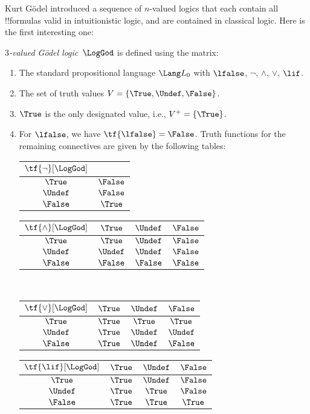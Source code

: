 \documentclass[../../../include/open-logic-section]{subfiles}
\begin{document}

Kurt G\"odel introduced a sequence of $n$-valued logics that each
contain all !!{formula}s valid in intuitionistic logic, and are
contained in classical logic.  Here is the first interesting one:

\begin{defn}
\emph{$3$-valued G\"odel logic}~$\LogGod$ is defined using the matrix:
\begin{enumerate}
  \item The standard propositional language $\Lang L_0$ with
  $\lfalse$, $\lnot$, $\land$, $\lor$, $\lif$.
  \item The set of truth values $V = \{\True, \Undef, \False\}$.
  \item $\True$ is the only designated value, i.e., $V^+ = \{\True\}$.
  \item For $\lfalse$, we have $\tf{\lfalse} = \False$. Truth
  functions for the remaining connectives are given by the following
  tables:
  \begin{center}
    \begin{tabular}{c|c} 
      $\tf{\lnot}[\LogGod]$ & \\ 
      \hline  
      $\True$ & $\False$ \\ 
      $\Undef$ & $\False$ \\
      $\False$ & $\True$ 
    \end{tabular}
    \quad
    \begin{tabular}{c|ccc} 
      $\tf{\land}[\LogGod]$ & $\True$ & $\Undef$ & $\False$ \\ 
      \hline 
      $\True$ & $\True$ & $\Undef$ & $\False$ \\ 
      $\Undef$ & $\Undef$ & $\Undef$ & $\False$\\ 
      $\False$ & $\False$ & $\False$ & $\False$ 
    \end{tabular}
    \\[2ex]
    \begin{tabular}{c|ccc} 
      $\tf{\lor}[\LogGod]$ & $\True$ & $\Undef$ & $\False$ \\ 
      \hline 
      $\True$ & $\True$ & $\True$ & $\True$ \\ 
      $\Undef$ & $\True$ & $\Undef$ & $\Undef$ \\
      $\False$ & $\True$ & $\Undef$ & $\False$ 
    \end{tabular}
    \quad
    \begin{tabular}{c|ccc} 
      $\tf{\lif}[\LogGod]$ & $\True$ & $\Undef$ & $\False$ \\ 
      \hline 
      $\True$ & $\True$ & $\Undef$ & $\False$ \\ 
      $\Undef$ & $\True$ & $\True$ & $\False$  \\ 
      $\False$ & $\True$ & $\True$ & $\True$ 
    \end{tabular}
  \end{center} 
\end{enumerate}
\end{defn}
\end{document}
